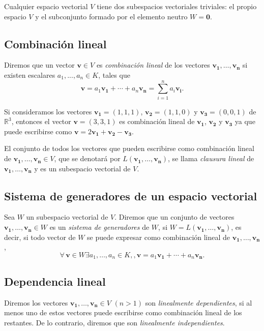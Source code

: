 \documentclass[a4paper]{article}
\begin{document}
Cualquier espacio vectorial $V$ tiene dos subespacios vectoriales triviales: el propio espacio $V$ y el subconjunto formado por el elemento neutro $W={\mathbf{0}}$.

\subsection*{Combinación lineal}
Diremos que un vector $\mathbf{v}\in V$ es \emph{combinación lineal} de los vectores $\mathbf{v_1},\ldots,\mathbf{v_n}$ si existen escalares $a_1,...,a_n\in K$, tales que
\[\mathbf{v }= a_1\mathbf{v_1}+\cdots+ a_n\mathbf{v_n}=\sum_{i=1}^n{a_i\mathbf{v_i}}.\]

\begin{ejemplo}
Si consideramos los vectores $\mathbf{v_1}=(1,1,1)$, $\mathbf{v_2}=(1,1,0)$ y $\mathbf{v_3}=(0,0,1)$ de $\mathbb{R}^3$, entonces el vector $\mathbf{v}=(3,3,1)$ es combinación lineal de $\mathbf{v_1}$, $\mathbf{v_2}$ y $\mathbf{v_3}$ ya que puede escribirse como $\mathbf{v}=2 \mathbf{v_1}+ \mathbf{v_2}- \mathbf{v_3}$.
\end{ejemplo}

El conjunto de todos los vectores que pueden escribirse como combinación lineal de $\mathbf{v_1},\ldots,\mathbf{v_n}\in V$, que se denotará por $L(\mathbf{v_1},\ldots,\mathbf{v_n})$, se llama \emph{clausura lineal} de $\mathbf{v_1},\ldots,\mathbf{v_n}$ y es un subespacio vectorial de $V$.

\subsection*{Sistema de generadores de un espacio vectorial}
Sea $W$ un subespacio vectorial de $V$. Diremos que un conjunto de vectores $\mathbf{v_1},\ldots,\mathbf{v_n}\in W$ es un \emph{sistema de generadores} de $W$, si  $W=L(\mathbf{v_1},\ldots,\mathbf{v_n})$, es decir, si todo vector de $W$ se puede expresar como combinación lineal de $\mathbf{v_1},\ldots,\mathbf{v_n}$,
\[ \forall\, \mathbf{v}\in W \exists a_1,\ldots,a_n\in K,,  \mathbf{v} = a_1\mathbf{v_1}+\cdots+ a_n\mathbf{v_n}.\]

\subsection*{Dependencia lineal}
Diremos los vectores $\mathbf{v_1},\ldots,\mathbf{v_n}\in V$ $(n>1)$ son \emph{linealmente dependientes}, si al menos uno de estos vectores puede escribirse como combinación lineal de los restantes. De lo contrario, diremos que son \emph{linealmente independientes}.
\end{document}
